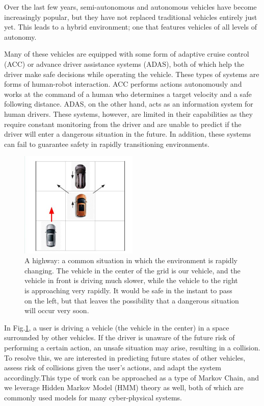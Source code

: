 \documentclass[conference]{IEEEtran}
\begin{document}
    Over the last few years, semi-autonomous and autonomous vehicles have become increasingly popular, but they have not replaced traditional vehicles entirely just yet. This leads to a hybrid environment; one that features vehicles of all levels of autonomy.
    
    Many of these vehicles are equipped with some form of adaptive cruise control (ACC) or advance driver assistance systems (ADAS), both of which help the driver make safe decisions while operating the vehicle. These types of systems are forms of human-robot interaction. ACC performs actions autonomously and works at the command of a human who determines a target velocity and a safe following distance. ADAS, on the other hand, acts as an information system for human drivers. These systems, however, are limited in their capabilities as they require constant monitoring from the driver and are unable to predict if the driver will enter a dangerous situation in the future. In addition, these systems can fail to guarantee safety in rapidly transitioning environments.
    

\begin{figure}[ht]
    \includegraphics[width=0.5\textwidth]{highwaysit.JPG}
    \caption{A highway: a common situation in which the environment is rapidly changing. The vehicle in the center of the grid is our vehicle, and the vehicle in front is driving much slower, while the vehicle to the right is approaching very rapidly. It would be safe in the instant to pass on the left, but that leaves the possibility that a dangerous situation will occur very soon.}
    \label{fig:hiway}
\end{figure}
    
    In Fig.\ref{fig:hiway}, a  user is driving a vehicle (the vehicle in the center) in a space surrounded by other vehicles. If the driver is unaware of the future risk of performing a certain action, an unsafe situation may arise, resulting in a collision. To resolve this, we are interested in predicting future states of other vehicles, assess risk of collisions given the user's actions, and adapt the system accordingly.This type of work can be approached as a type of Markov Chain, and we leverage Hidden Markov Model (HMM) theory as well, both of which are commonly used models for many cyber-physical systems.
    
\end{document}

